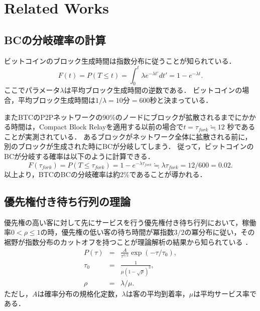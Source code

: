 \documentclass[graybox]{svmult}
\begin{document}
\section{Related Works}
\label{sec:rworks}

\subsection{BCの分岐確率の計算}
\label{sec:fork}

ビットコインのブロック生成時間は指数分布に従うことが知られている．
%
\begin{equation}
	F(t) = P(T \le t) = \int_{0}^{t} \lambda e^{-\lambda t'} dt' = 1 - e^{-\lambda t}. \label{eq:exp}
\end{equation}
%
ここでパラメータ$\lambda$は平均ブロック生成時間の逆数である．
ビットコインの場合，平均ブロック生成時間は$1/\lambda=10$分$=600$秒と決まっている．

またBTCのP2Pネットワークの90\%のノードにブロックが拡散されるまでにかかる時間は，Compact Block Relayを適用する以前の場合で$t = \tau_{fork} \fallingdotseq 12$ 秒であることが実測されている\cite{bloX}．
あるブロックがネットワーク全体に拡散される前に，別のブロックが生成された時にBCが分岐してしまう．
従って，ビットコインのBCが分岐する確率は以下のように計算できる．
%
\begin{equation}
  F(\tau_{fork}) = P(T \le \tau_{fork}) = 1 - e^{-\lambda \tau_{fork}} \fallingdotseq \lambda \tau_{fork} = 12/600 = 0.02. 
\end{equation}
%
以上より，BTCのBCの分岐確率は約2\%であることが導かれる．



\subsection{優先権付き待ち行列の理論}
\label{sec:priorityqueue}

優先権の高い客に対して先にサービスを行う優先権付き待ち行列において，稼働率$0 < \rho \le 1$の時，優先権の低い客の待ち時間が冪指数$3/2$の冪分布に従い，その裾野が指数分布のカットオフを持つことが理論解析の結果から知られている
\cite{OB2005}．
%
\begin{eqnarray}
  P(\tau) &=& \frac{A}{\tau^{3/2}} \exp(-\tau/\tau_0), \\
  \tau_0  &=& \frac{1}{\mu (1-\sqrt{\rho})^2}, \\
  \rho    &=& \lambda / \mu.
\end{eqnarray}
%
ただし，$A$は確率分布の規格化定数，$\lambda$は客の平均到着率，$\mu$は平均サービス率である．
\end{document}
